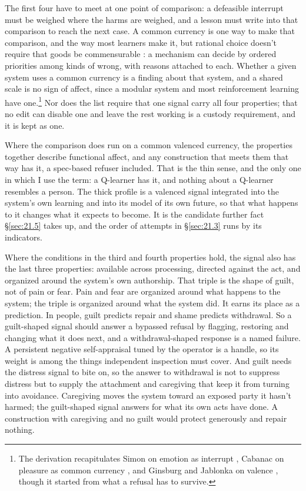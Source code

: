 The first four have to meet at one point of comparison: a defeasible interrupt must be weighed where the harms are weighed, and a lesson must write into that comparison to reach the next case. A common currency is one way to make that comparison, and the way most learners make it, but rational choice doesn't require that goods be commensurable \autocite{anderson1993value}: a mechanism can decide by ordered priorities among kinds of wrong, with reasons attached to each. Whether a given system uses a common currency is a finding about that system, and a shared scale is no sign of affect, since a modular system and most reinforcement learning have one.\footnote{The derivation recapitulates Simon on emotion as interrupt \autocite{simon1967motivational}, Cabanac on pleasure as common currency \autocite{cabanac1992pleasure}, and Ginsburg and Jablonka on valence \autocite{ginsburg2019evolution}, though it started from what a refusal has to survive.} Nor does the list require that one signal carry all four properties; that no edit can disable one and leave the rest working is a custody requirement, and it is kept as one.

Where the comparison does run on a common valenced currency, the properties together describe functional affect, and any construction that meets them that way has it, a spec-based refuser included. That is the thin sense, and the only one in which I use the term: a Q-learner has it, and nothing about a Q-learner resembles a person. The thick profile is a valenced signal integrated into the system's own learning and into its model of its own future, so that what happens to it changes what it expects to become. It is the candidate further fact \S\ref{sec:21.5} takes up, and the order of attempts in \S\ref{sec:21.3} runs by its indicators.

Where the conditions in the third and fourth properties hold, the signal also has the last three properties: available across processing, directed against the act, and organized around the system's own authorship. That triple is the shape of guilt, not of pain or fear. Pain and fear are organized around what happens to the system; the triple is organized around what the system did. It earns its place as a prediction. In people, guilt predicts repair and shame predicts withdrawal. So a guilt-shaped signal should answer a bypassed refusal by flagging, restoring and changing what it does next, and a withdrawal-shaped response is a named failure. A persistent negative self-appraisal tuned by the operator is a handle, so its weight is among the things independent inspection must cover. And guilt needs the distress signal to bite on, so the answer to withdrawal is not to suppress distress but to supply the attachment and caregiving that keep it from turning into avoidance. Caregiving moves the system toward an exposed party it hasn't harmed; the guilt-shaped signal answers for what its own acts have done. A construction with caregiving and no guilt would protect generously and repair nothing.

